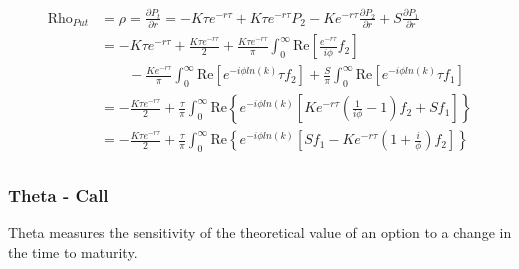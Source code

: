 \documentclass[a4paper]{article}
\begin{document}
\begin{align*}
	\mbox{Rho}_{Put} 
	& = \rho = \frac{\partial P_t}{\partial r} 
	= 
	- K\tau e^{-r\tau} + K\tau e^{-r\tau} P_2
	- K e^{-r\tau} \frac{\partial P_2}{\partial r}
	+ S\frac{\partial P_1}{\partial r} \\
	& 
	= 
	- K\tau e^{-r\tau}
	+ \frac{K\tau e^{-r\tau}}{2} 
	+ \frac{K\tau e^{-r\tau}}{\pi} \int_0^\infty \mbox{Re}\left[\frac{e^{-r\tau}}{i\phi} f_2 \right] \\
	&
	\quad \quad- \frac{Ke^{-r\tau}}{\pi} \int_0^\infty \mbox{Re}\left[e^{-i\phi ln(k)} \tau f_2 \right]
	+ \frac{S}{\pi} \int_0^\infty \mbox{Re}\left[e^{-i\phi ln(k)} \tau f_1 \right] \\
	&
	= 
	- \frac{K\tau e^{-r\tau}}{2} 
	+ \frac{\tau}{\pi} \int_0^\infty \mbox{Re}\left\{e^{-i\phi ln(k)} \left[Ke^{-r\tau} \left(\frac{1}{i\phi} - 1 \right)f_2 + Sf_1 \right] \right\} \\
	&
	=
	- \frac{K\tau e^{-r\tau}}{2} 
	+ \frac{\tau}{\pi} \int_0^\infty \mbox{Re}\left\{e^{-i\phi ln(k)} \left[Sf_1 - Ke^{-r\tau} \left(1 + \frac{i}{\phi} \right)f_2 \right] \right\} \\
\end{align*}





\newpage





\subsubsection*{Theta - Call}

Theta measures the sensitivity of the theoretical value of an option to a change in the time to maturity.
\end{document}

